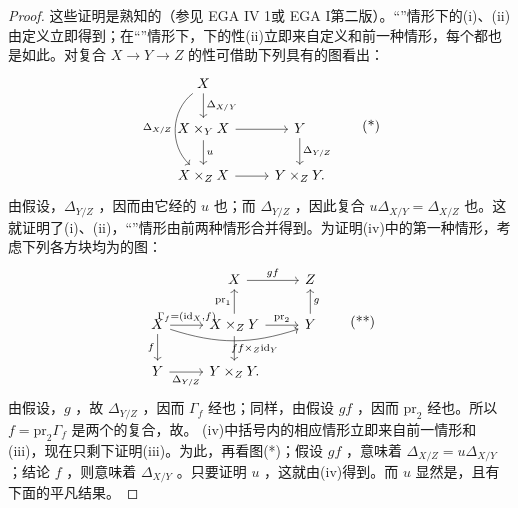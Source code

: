\begin{proof}
这些证明是熟知的（参见 EGA IV 1或 EGA I第二版）。“”情形下的(i)、(ii)由定义立即得到；在“”情形下，下的性(ii)立即来自定义和前一种情形，每个都也是如此。对复合 $X\to Y\to Z$ 的性可借助下列具有的图看出：
\[
\begin{tikzcd}
X \arrow[d,"\Delta_{X/Y}"] \arrow[dd,bend right=50,"\Delta_{X/Z}"'] & \\
X\times_Y X \arrow[r] \arrow[d,"u"] & Y\arrow[d,"\Delta_{Y/Z}"]\\
X\times_Z X \arrow[r] &Y\times_Z Y .
\end{tikzcd}\tag{*}
\]
由假设，$\Delta_{Y/Z}$ ，因而由它经的 $u$ 也；而 $\Delta_{Y/Z}$ ，因此复合 $u\Delta_{X/Y}=\Delta_{X/Z}$ 也。这就证明了(i)、(ii)，“”情形由前两种情形合并得到。为证明(iv)中的第一种情形，考虑下列各方块均为的图：
\[
\begin{tikzcd}
& X\arrow[r,"gf"] &Z\\
X\arrow[r,"{\Gamma_f=(\mathrm{id}_X,f)}"]\arrow[d,"f"']\arrow[rr,bend right=18,"f"']
&X\times_Z Y\arrow[u,"\mathrm{pr}_1"]\arrow[r,"\mathrm{pr}_2"]\arrow[d,"f\times_Z\mathrm{id}_Y"] &Y\arrow[u,"g"']\\
Y\arrow[r,"\Delta_{Y/Z}"']&Y\times_Z Y .&
\end{tikzcd}\tag{**}
\]
由假设，$g$ ，故 $\Delta_{Y/Z}$ ，因而 $\Gamma_f$ 经也；同样，由假设 $gf$ ，因而 $\mathrm{pr}_2$ 经也。所以 $f=\mathrm{pr}_2\Gamma_f$ 是两个的复合，故。
(iv)中括号内的相应情形立即来自前一情形和(iii)，现在只剩下证明(iii)。为此，再看图(*)；假设 $gf$ ，意味着 $\Delta_{X/Z}=u\Delta_{X/Y}$ ；结论 $f$ ，则意味着 $\Delta_{X/Y}$ 。只要证明 $u$ ，这就由(iv)得到。而 $u$ 显然是，且有下面的平凡结果。
\end{proof}
